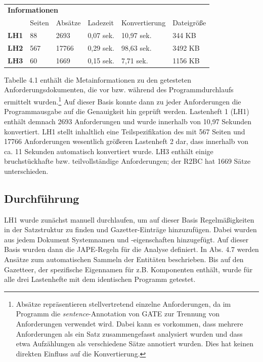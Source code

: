 \documentclass[12pt]{report}
\begin{document}
\vspace{12pt}
\begin{table}[h!]
\tt
\begin{tabular}{llllll}
\multicolumn{6}{l}{\textbf{Informationen}}                                                                                                   \\
\multicolumn{1}{l|}{}             & Seiten & \multicolumn{1}{l|}{Absätze} & Ladezeit  & \multicolumn{1}{l|}{Konvertierung} & Dateigröße \\ \hline
\multicolumn{1}{l|}{\textbf{LH1}} & 88     & \multicolumn{1}{l|}{2693}    & 0,07 sek. & \multicolumn{1}{l|}{10,97 sek.}         & 344 KB     \\
\multicolumn{1}{l|}{\textbf{LH2}} & 567    & \multicolumn{1}{l|}{17766}   & 0,29 sek. & \multicolumn{1}{l|}{98,63 sek.}         & 3492 KB    \\
\multicolumn{1}{l|}{\textbf{LH3}} & 60     & \multicolumn{1}{l|}{1669}    & 0,15 sek. & \multicolumn{1}{l|}{7,71 sek.}          & 1156 KB   
\end{tabular}
\rm
{}
\end{table}
\vspace{12pt}

Tabelle 4.1 enthält die Metainformationen zu den getesteten Anforderungsdokumenten, die vor bzw. während des Programmdurchlaufs ermittelt wurden.\footnote{Absätze repräsentieren stellvertretend einzelne Anforderungen, da im Programm die \textit{sentence}-Annotation von GATE zur Trennung von Anforderungen verwendet wird. Dabei kann es vorkommen, dass mehrere Anforderungen als ein Satz zusammengefasst analysiert wurden und dass etwa Aufzählungen als verschiedene Sätze annotiert wurden. Dies hat keinen direkten Einfluss auf die Konvertierung.} Auf dieser Basis konnte dann zu jeder Anforderungen die Programmausgabe auf die Genauigkeit hin geprüft werden.
Lastenheft 1 (LH1) enthält demnach 2693 Anforderungen und wurde innerhalb von 10,97 Sekunden konvertiert. LH1 stellt inhaltlich eine Teilspezifikation des mit 567 Seiten und 17766 Anforderungen wesentlich größeren Lastenheft 2 dar, dass innerhalb von ca. 11 Sekunden automatisch konvertiert wurde. LH3 enthält einige bruchstückhafte bzw. teilvollständige Anforderungen; der R2BC hat 1669 Sätze unterschieden.

\subsection{Durchführung}
LH1 wurde zunächst manuell durchlaufen, um auf dieser Basis Regelmäßigkeiten in der Satzstruktur zu finden und Gazetter-Einträge hinzuzufügen. Dabei wurden aus jedem Dokument Systemnamen und -eigenschaften hinzugefügt. Auf dieser Basis wurden dann die JAPE-Regeln für die Analyse definiert. In Abs. 4.7 werden Ansätze zum automatischen Sammeln der Entitäten beschrieben. Bis auf den Gazetteer, der spezifische Eigennamen für z.B. Komponenten enthält, wurde für alle drei Lastenhefte mit dem identischen Programm getestet.
\end{document}
